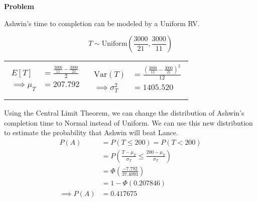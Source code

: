 \documentclass[12pt]{article}
\newenvironment{Ex}{\textbf{Problem}\vspace{.75em}\\}{}
\begin{document}
\begin{enumerate}
\begin{Ex}
\begin{solution}
\begin{enumerate}
        Ashwin's time to completion can be modeled by a Uniform RV.
        \begin{table}[H]
          \begin{equation}
            \label{eq:4d-time}
            T\sim\text{Uniform}\left(\frac{3000}{21},\frac{3000}{11}\right)
          \end{equation}
          \begin{tabularx}{\linewidth}{XX}
            \begin{equation}
              \label{eq:4d-mean}
              \begin{aligned}
                E[T] &= \frac{\frac{3000}{11} - \frac{3000}{21}}{2} \\
                \implies \mu_T &= 207.792 \\
              \end{aligned}
            \end{equation}
            &
            \begin{equation}
              \label{eq:4d-var}
              \begin{aligned}
                \text{Var}(T) &= \frac{(\frac{3000}{11} - \frac{3000}{21})^2}{12} \\
                \implies \sigma_T^2 &= 1405.520 \\
              \end{aligned}
            \end{equation}
          \end{tabularx}
        \end{table}
        Using the Central Limit Theorem, we can change the
        distribution of Ashwin's completion time to Normal instead of
        Uniform. We can use this new distribution to estimate the
        probability that Ashwin will beat Lance.
        \begin{equation}
          \label{eq:4d-sol}
          \begin{aligned}
            P(A) &= P(T\le 200) = P(T<200)\\
            &= P\left(\frac{T-\mu_T}{\sigma_T} \le
              \frac{200-\mu_T}{\sigma_T}\right) \\
            &= \Phi\left(\frac{-7.792}{37.4093}\right) \\
            &= 1 - \Phi(0.207846) \\
            \implies P(A) &= 0.417675 \\
          \end{aligned}
        \end{equation}
      \end{enumerate}
    \end{solution}
  \end{Ex}


\end{enumerate}
\end{document}
